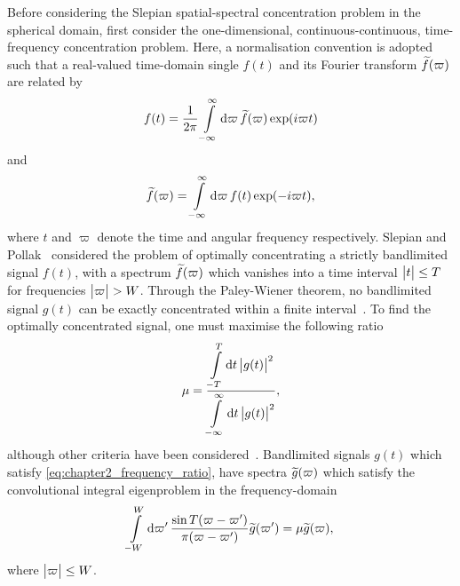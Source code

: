 Before considering the Slepian spatial-spectral concentration problem in the spherical domain, first consider the one-dimensional, continuous-continuous, time-frequency concentration problem.
Here, a normalisation convention is adopted such that a real-valued time-domain single \(f(t)\) and its Fourier transform \(\widetilde{f}(\varpi)\) are related by
%
\begin{equation}\label{eq:chapter2_fourier_time}
	f(t)
	= \frac{1}{2\pi} \int\limits_{-\infty}^{\infty} \dd{\varpi} \widetilde{f}(\varpi) \exp(i\varpi t)
\end{equation}
%
and
%
\begin{equation}\label{eq:chapter2_fourier_frequency}
	\widetilde{f}(\varpi)
	= \int\limits_{-\infty}^{\infty} \dd{\varpi} f(t) \exp(-i\varpi t),
\end{equation}
%
where \(t\) and \(\varpi{}\) denote the time and angular frequency respectively.
Slepian and Pollak~\cite{Slepian1961} considered the problem of optimally concentrating a strictly bandlimited signal \(f(t)\), with a spectrum \(\widetilde{f}(\varpi)\) which vanishes into a time interval \(\big\lvert t\big\rvert \leq T\) for frequencies \(\big\lvert\varpi\big\rvert > W\).
Through the Paley-Wiener theorem, no bandlimited signal \(g(t)\) can be exactly concentrated within a finite interval~\cite{Daubechies1992,Mallat2008}.
To find the optimally concentrated signal, one must maximise the following ratio
%
\begin{equation}\label{eq:chapter2_frequency_ratio}
	\mu
	= \frac{\displaystyle\int\limits_{-T}^{T} \dd{t} \big\lvert g(t)\big\rvert^{2}}
	{\displaystyle\int\limits_{-\infty}^{\infty} \dd{t} \big\lvert g(t)\big\rvert^{2}},
\end{equation}
%
although other criteria have been considered~\cite{Freeden1997,Riedel1995}.
Bandlimited signals \(g(t)\) which satisfy \cref{eq:chapter2_frequency_ratio}, have spectra \(\widetilde{g}(\varpi)\) which satisfy the convolutional integral eigenproblem in the frequency-domain
%
\begin{equation}\label{eq:chapter2_frequency_eigenproblem}
	\int\limits_{-W}^{W} \dd{\varpi'} \frac{\sin{T(\varpi-\varpi')}}{\pi(\varpi-\varpi')} \widetilde{g}(\varpi')
	= \mu \widetilde{g}(\varpi),
\end{equation}
%
where \(\big\lvert\varpi\big\rvert \leq W\).

